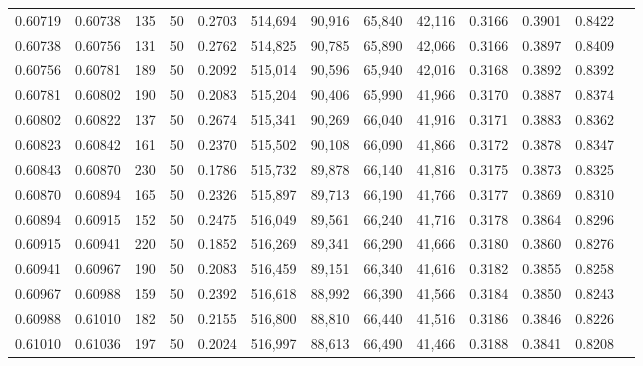 \begin{tabular}{rrrrrrrrrrrrr}
0.60719 & 0.60738 &   135 &  50 &                                     0.2703 & 514,694 &  90,916 &  65,840 &  42,116 & 0.3166 & 0.3901 & 0.8422 \\
0.60738 & 0.60756 &   131 &  50 &                                     0.2762 & 514,825 &  90,785 &  65,890 &  42,066 & 0.3166 & 0.3897 & 0.8409 \\
0.60756 & 0.60781 &   189 &  50 &                                     0.2092 & 515,014 &  90,596 &  65,940 &  42,016 & 0.3168 & 0.3892 & 0.8392 \\
0.60781 & 0.60802 &   190 &  50 &                                     0.2083 & 515,204 &  90,406 &  65,990 &  41,966 & 0.3170 & 0.3887 & 0.8374 \\
0.60802 & 0.60822 &   137 &  50 &                                     0.2674 & 515,341 &  90,269 &  66,040 &  41,916 & 0.3171 & 0.3883 & 0.8362 \\
0.60823 & 0.60842 &   161 &  50 &                                     0.2370 & 515,502 &  90,108 &  66,090 &  41,866 & 0.3172 & 0.3878 & 0.8347 \\
0.60843 & 0.60870 &   230 &  50 &                                     0.1786 & 515,732 &  89,878 &  66,140 &  41,816 & 0.3175 & 0.3873 & 0.8325 \\
0.60870 & 0.60894 &   165 &  50 &                                     0.2326 & 515,897 &  89,713 &  66,190 &  41,766 & 0.3177 & 0.3869 & 0.8310 \\
0.60894 & 0.60915 &   152 &  50 &                                     0.2475 & 516,049 &  89,561 &  66,240 &  41,716 & 0.3178 & 0.3864 & 0.8296 \\
0.60915 & 0.60941 &   220 &  50 &                                     0.1852 & 516,269 &  89,341 &  66,290 &  41,666 & 0.3180 & 0.3860 & 0.8276 \\
0.60941 & 0.60967 &   190 &  50 &                                     0.2083 & 516,459 &  89,151 &  66,340 &  41,616 & 0.3182 & 0.3855 & 0.8258 \\
0.60967 & 0.60988 &   159 &  50 &                                     0.2392 & 516,618 &  88,992 &  66,390 &  41,566 & 0.3184 & 0.3850 & 0.8243 \\
0.60988 & 0.61010 &   182 &  50 &                                     0.2155 & 516,800 &  88,810 &  66,440 &  41,516 & 0.3186 & 0.3846 & 0.8226 \\
0.61010 & 0.61036 &   197 &  50 &                                     0.2024 & 516,997 &  88,613 &  66,490 &  41,466 & 0.3188 & 0.3841 & 0.8208 \\

\end{tabular}
